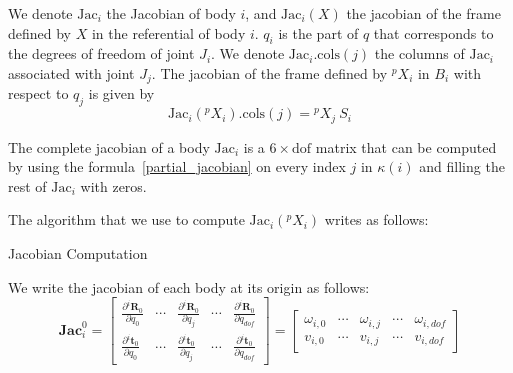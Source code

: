 We denote $\text{Jac}_i$ the Jacobian of body $i$, and $\text{Jac}_i(X)$ the jacobian of the frame defined by $X$ in the referential of body $i$.
$q_i$ is the part of $q$ that corresponds to the degrees of freedom of joint $J_i$.
We denote $\text{Jac}_i.\text{cols}(j)$ the columns of $\text{Jac}_i$ associated with joint $J_j$.
The jacobian of the frame defined by ${}^p X_i$ in $B_i$ with respect to $q_j$ is given by
\begin{equation}
\label{partial_jacobian}
  \text{Jac}_i({}^p X_i).\text{cols}(j) = {}^p X_j\ S_i
\end{equation}

The complete jacobian of a body $\text{Jac}_i$ is a $6\times \text{dof}$ matrix that can be computed by using the formula~\ref{partial_jacobian} on every index $j$ in $\kappa(i)$ and filling the rest of $\text{Jac}_i$ with zeros.

The algorithm that we use to compute $\text{Jac}_i({}{}^p X_i)$ writes as follows:

\begin{algorithm}
  \caption{Jacobian Computation}
\label{alg:jacobian_computation}
\begin{algorithmic}
  \EndFor{}
\end{algorithmic}
\end{algorithm}

We write the jacobian of each body at its origin as follows:
\begin{equation}
  \mathbf{Jac}^0_i =
  \begin{bmatrix}
    \frac{\partial {}^i\mathbf{R}_0}{\partial q_0} & \cdots &
    \frac{\partial {}^i\mathbf{R}_0}{\partial q_j} & \cdots &
    \frac{\partial {}^i\mathbf{R}_0}{\partial q_{dof}} \\
    \frac{\partial {}^i\mathbf{t}_0}{\partial q_0} & \cdots &
    \frac{\partial {}^i\mathbf{t}_0}{\partial q_j} & \cdots &
    \frac{\partial {}^i\mathbf{t}_0}{\partial q_{dof}}
  \end{bmatrix}
=
  \begin{bmatrix}
    \omega_{i,0} & \cdots &
    \omega_{i,j} & \cdots &
    \omega_{i,dof} \\
    v_{i,0} & \cdots &
    v_{i,j} & \cdots &
    v_{i,dof}
  \end{bmatrix}
\end{equation}




